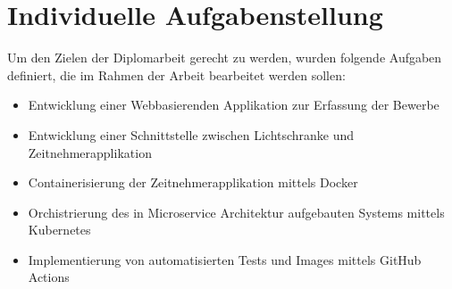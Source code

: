 
\section{Individuelle Aufgabenstellung}

Um den Zielen der Diplomarbeit gerecht zu werden, wurden folgende Aufgaben definiert, die im Rahmen der Arbeit bearbeitet werden sollen:
\begin{itemize}
    \item Entwicklung einer Webbasierenden Applikation zur Erfassung der Bewerbe
    \item Entwicklung einer Schnittstelle zwischen Lichtschranke und Zeitnehmerapplikation
    \item Containerisierung der Zeitnehmerapplikation mittels Docker
    \item Orchistrierung des in Microservice Architektur aufgebauten Systems mittels Kubernetes
    \item Implementierung von automatisierten Tests und Images mittels GitHub Actions
\end{itemize}
